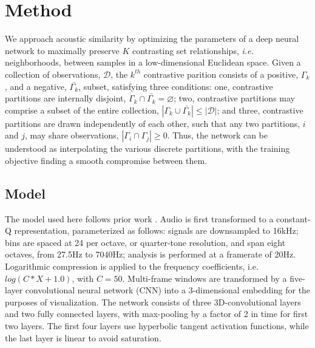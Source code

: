 \documentclass{article}
\begin{document}



\section{Method}

We approach acoustic similarity by optimizing the parameters of a deep neural network to maximally preserve $K$ contrasting set relationships, \emph{i.e.} neighborhoods, between samples in a low-dimensional Euclidean space.
Given a collection of observations, $\mathcal{D}$, the $k^{th}$ contrastive parition consists of a positive, $\Gamma_k$, and a negative, $\bar{\Gamma_k}$, subset, satisfying three conditions:
one, contrastive partitions are internally disjoint, $\Gamma_k \cap \bar{\Gamma_k} = \varnothing$;
two, contrastive partitions may comprise a subset of the entire collection, $|\Gamma_k \cup \bar{\Gamma_k}| \le |\mathcal{D}|$;
and three, contrastive partitions are drawn independently of each other, such that any two partitions, $i$ and $j$, may share observations, $|\Gamma_i \cap \Gamma_j| \ge 0$.
Thus, the network can be understood as interpolating the various discrete partitions, with the training objective finding a smooth compromise between them.


\subsection{Model}

The model used here follows prior work \cite{humphrey2015dl4mir}.
Audio is first transformed to a constant-Q representation, parameterized as follows:
signals are downsampled to 16kHz;
bins are spaced at 24 per octave, or quarter-tone resolution, and span eight octaves, from 27.5Hz to 7040Hz;
analysis is performed at a framerate of 20Hz.
Logarithmic compression is applied to the frequency coefficients, i.e. $log(C*X + 1.0)$, with $C=50$.
Multi-frame windows are transformed by a five-layer convolutional neural network (CNN) into a 3-dimensional embedding for the purposes of visualization.
The network consists of three 3D-convolutional layers and two fully connected layers, with max-pooling by a factor of 2 in time for first two layers.
The first four layers use hyperbolic tangent activation functions, while the last layer is linear to avoid saturation.
\end{document}
